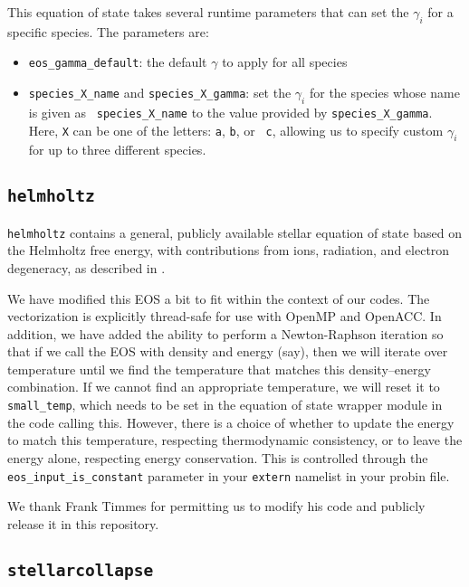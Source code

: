 This equation of state takes several runtime parameters that can set
the $\gamma_i$ for a specific species.  The parameters are:
\begin{itemize}
\item {\tt eos\_gamma\_default}: the default $\gamma$ to apply for all
  species
\item {\tt species\_X\_name} and {\tt species\_X\_gamma}: set the
  $\gamma_i$ for the species whose name is given as {\tt
  species\_X\_name} to the value provided by {\tt species\_X\_gamma}.
  Here, {\tt X} can be one of the letters: {\tt a}, {\tt b}, or {\tt
    c}, allowing us to specify custom $\gamma_i$ for up to three
  different species.
\end{itemize}

\subsection {\tt helmholtz}

{\tt helmholtz} contains a general, publicly available stellar
  equation of state based on the Helmholtz free energy, with
  contributions from ions, radiation, and electron degeneracy, as
  described in \cite{timmes:1999,timmes:2000,flash}.

We have modified this EOS a bit to fit within the context of our
codes. The vectorization is explicitly thread-safe for use with OpenMP
and OpenACC.  In addition, we have added the ability to perform a
Newton-Raphson iteration so that if we call the EOS with density and
energy (say), then we will iterate over temperature until we find the
temperature that matches this density--energy combination. If we
cannot find an appropriate temperature, we will reset it to {\tt
  small\_temp}, which needs to be set in the equation of state wrapper
module in the code calling this. However, there is a choice of whether
to update the energy to match this temperature, respecting
thermodynamic consistency, or to leave the energy alone, respecting
energy conservation. This is controlled through the
\texttt{eos\_input\_is\_constant} parameter in your \texttt{extern}
namelist in your probin file.

We thank Frank Timmes for permitting us to modify his code and
publicly release it in this repository.

\subsection {\tt stellarcollapse}

